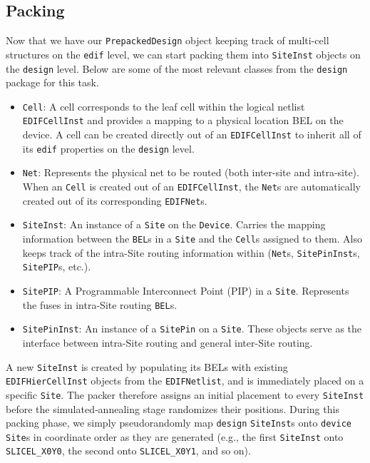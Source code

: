 \begin{multicols}{2}
\subsection{Packing}
\label{subsec:packing}
Now that we have our \texttt{PrepackedDesign} object keeping track of multi-cell structures on the \texttt{edif} level, we can start packing them into \texttt{SiteInst} objects on the \texttt{design} level. 
Below are some of the most relevant classes from the \texttt{design} package for this task.
\begin{itemize}
    \item \texttt{Cell}: A cell corresponds to the leaf cell within the logical netlist \texttt{EDIFCellInst} and provides a mapping to a physical location BEL on the device. A cell can be created directly out of an \texttt{EDIFCellInst} to inherit all of its \texttt{edif} properties on the \texttt{design} level.
    \item \texttt{Net}: Represents the physical net to be routed (both inter-site and intra-site). When an \texttt{Cell} is created out of an \texttt{EDIFCellInst}, the \texttt{Net}s are automatically created out of its corresponding \texttt{EDIFNet}s.
    \item \texttt{SiteInst}: An instance of a \texttt{Site} on the \texttt{Device}. Carries the mapping information between the \texttt{BEL}s in a \texttt{Site} and the \texttt{Cell}s assigned to them. Also keeps track of the intra-Site routing information within (\texttt{Net}s, \texttt{SitePinInst}s, \texttt{SitePIP}s, etc.).
    \item \texttt{SitePIP}: A Programmable Interconnect Point (PIP) in a \texttt{Site}. Represents the fuses in intra-Site routing \texttt{BEL}s. 
    \item \texttt{SitePinInst}: An instance of a \texttt{SitePin} on a \texttt{Site}. These objects serve as the interface between intra-Site routing and general inter-Site routing. 
\end{itemize}
\columnbreak


A new \texttt{SiteInst} is created by populating its BELs with existing \texttt{EDIFHierCellInst} objects from the \texttt{EDIFNetlist}, and is immediately placed on a specific \texttt{Site}. 
The packer therefore assigns an initial placement to every \texttt{SiteInst} before the simulated‐annealing stage randomizes their positions. 
During this packing phase, we simply pseudorandomly map \texttt{design} \texttt{SiteInst}s onto \texttt{device} \texttt{Site}s in coordinate order as they are generated (e.g., the first \texttt{SiteInst} onto \texttt{SLICEL\_X0Y0}, the second onto \texttt{SLICEL\_X0Y1}, and so on). 


\end{multicols}

